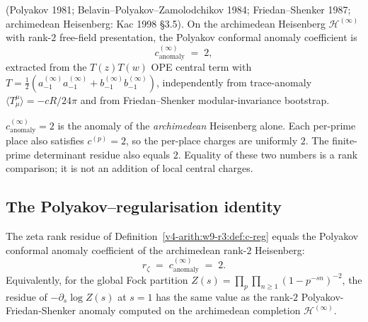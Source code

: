 \begin{theorem}
\label{v4-arith:w9-r3:thm:polyakov-anomaly}
\ClaimStatusProvedElsewhere (Polyakov 1981; Belavin--Polyakov--Zamolodchikov
1984; Friedan--Shenker 1987; archimedean Heisenberg: Kac 1998
\S 3.5). On the archimedean Heisenberg \(\mathcal{H}^{(\infty)}\) with
rank-\(2\) free-field presentation, the Polyakov conformal anomaly
coefficient is
\begin{equation}
\label{v4-arith:w9-r3:eq:polyakov-anomaly}
c^{(\infty)}_{\mathrm{anomaly}}\;=\;2,
\end{equation}
extracted from the \(T(z)T(w)\) OPE central term with
\(T=\tfrac{1}{2}(a_{-1}^{(\infty)}a_{-1}^{(\infty)}+b_{-1}^{(\infty)}b_{-1}^{(\infty)})\),
independently from trace-anomaly \(\langle T^{\mu}_{\mu}\rangle=-cR/24\pi\)
and from Friedan--Shenker modular-invariance bootstrap.
\end{theorem}

\begin{remark}
\label{v4-arith:w9-r3:rem:archimedean-vs-full}
\(c^{(\infty)}_{\mathrm{anomaly}}=2\) is the anomaly of the
\emph{archimedean} Heisenberg alone. Each per-prime place also satisfies
\(c^{(p)}=2\), so the per-place charges are uniformly \(2\). The
finite-prime determinant residue also equals \(2\). Equality of these
two numbers is a rank comparison; it is not an addition of local
central charges.
\end{remark}

\subsection{The Polyakov--regularisation identity}
\label{v4-arith:w9-r3:polyakov-id}

\begin{theorem}
\label{v4-arith:w9-r3:thm:polyakov-identity}
The zeta rank residue of
Definition~\ref{v4-arith:w9-r3:def:c-reg} equals the Polyakov conformal anomaly
coefficient of the archimedean rank-\(2\) Heisenberg:
\begin{equation}
\label{v4-arith:w9-r3:eq:polyakov-id}
r_{\zeta}\;=\;c^{(\infty)}_{\mathrm{anomaly}}\;=\;2.
\end{equation}
Equivalently, for the global Fock partition
\(Z(s)=\prod_{p}\prod_{n\geq1}(1-p^{-sn})^{-2}\),
the residue of \(-\partial_s\log Z(s)\) at \(s=1\)
has the same value as the rank-\(2\) Polyakov-Friedan-Shenker anomaly
computed on the archimedean completion \(\mathcal{H}^{(\infty)}\).
\end{theorem}

